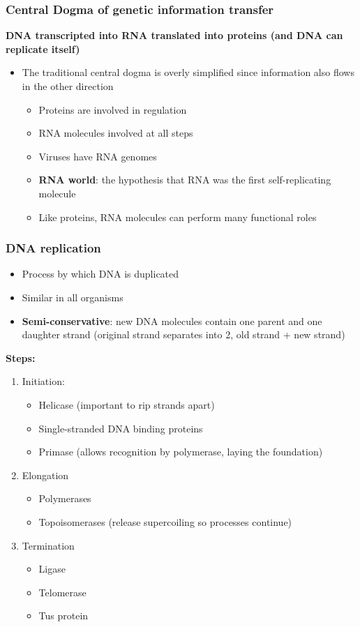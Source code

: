 \documentclass[letterpaper, 12pt]{article}
\begin{document}
\subsubsection*{Central Dogma of genetic information transfer}

\textbf{DNA transcripted into RNA translated into proteins (and DNA can replicate itself)}

\begin{itemize}
\item The traditional central dogma is overly simplified since information also flows in the other direction
\begin{itemize}
\item Proteins are involved in regulation
\item RNA molecules involved at all steps
\item Viruses have RNA genomes
\item \textbf{RNA world}: the hypothesis that RNA was the first self-replicating molecule
\item Like proteins, RNA molecules can perform many functional roles
\end{itemize}
\end{itemize}

\subsubsection*{DNA replication}

\begin{itemize}
\item Process by which DNA is duplicated
\item Similar in all organisms
\item \textbf{Semi-conservative}: new DNA molecules contain one parent and one daughter strand (original strand separates into 2, old strand + new strand)
\end{itemize}

\textbf{Steps:}

\begin{enumerate}
\item Initiation:
\begin{itemize}
\item Helicase (important to rip strands apart)
\item Single-stranded DNA binding proteins
\item Primase (allows recognition by polymerase, laying the foundation)
\end{itemize}
\item Elongation
\begin{itemize}
\item Polymerases
\item Topoisomerases (release supercoiling so processes continue)
\end{itemize}
\item Termination
\begin{itemize}
\item Ligase
\item Telomerase
\item Tus protein
\end{itemize}
\end{enumerate}
\end{document}
